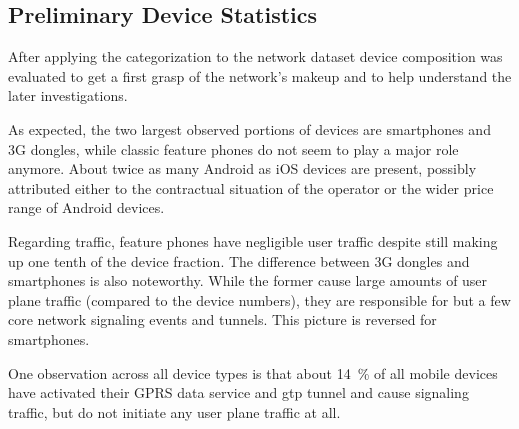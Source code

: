 \subsection{Preliminary Device Statistics}

After applying the categorization to the network dataset device composition was evaluated to get a first grasp of the network's makeup and to help understand the later investigations.

As expected, the two largest observed portions of devices are smartphones and \gls{3G} dongles, while classic feature phones do not seem to play a major role anymore. About twice as many Android as iOS devices are present, possibly attributed either to the contractual situation of the operator or the wider price range of Android devices.

Regarding traffic, feature phones have negligible user traffic despite still making up one tenth of the device fraction. The difference between \gls{3G} dongles and smartphones is also noteworthy. While the former cause large amounts of user plane traffic (compared to the device numbers), they are responsible for but a few core network signaling events and tunnels. This picture is reversed for smartphones.

One observation across all device types is that about \SI{14}{\percent} of all mobile devices have activated their \gls{GPRS} data service and \gls{gtp} tunnel and cause signaling traffic, but do not initiate any user plane traffic at all.